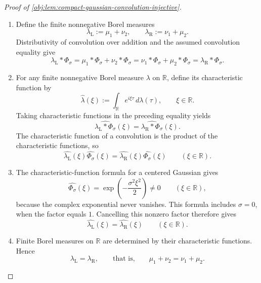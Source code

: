\begin{proof}[Proof of \cref{obj:lem:compact-gaussian-convolution-injective}]
\begin{enumerate}
\item Define the finite nonnegative Borel measures
\[
\lambda_{\mathrm L}:=\mu_1+\nu_2,
\qquad
\lambda_{\mathrm R}:=\nu_1+\mu_2.
\]
Distributivity of convolution over addition and the assumed convolution equality give
\[
\lambda_{\mathrm L}*\Phi_\sigma
=\mu_1*\Phi_\sigma+\nu_2*\Phi_\sigma
=\nu_1*\Phi_\sigma+\mu_2*\Phi_\sigma
=\lambda_{\mathrm R}*\Phi_\sigma.
\]

\item For any finite nonnegative Borel measure \(\lambda\) on \(\mathbb R\), define its characteristic function by
\[
\widehat{\lambda}(\xi)
:=\int_{\mathbb R}e^{i\xi\tau}\,d\lambda(\tau),
\qquad \xi\in\mathbb R.
\]
Taking characteristic functions in the preceding equality yields
\[
\widehat{\lambda_{\mathrm L}*\Phi_\sigma}(\xi)
=
\widehat{\lambda_{\mathrm R}*\Phi_\sigma}(\xi).
\]
The characteristic function of a convolution is the product of the characteristic functions, so
\[
\widehat{\lambda_{\mathrm L}}(\xi)\widehat{\Phi_\sigma}(\xi)
=
\widehat{\lambda_{\mathrm R}}(\xi)\widehat{\Phi_\sigma}(\xi)
\qquad(\xi\in\mathbb R).
\]

\item The characteristic-function formula for a centered Gaussian gives
\[
\widehat{\Phi_\sigma}(\xi)
=\exp\!\left(-\frac{\sigma^2\xi^2}{2}\right)\ne0
\qquad(\xi\in\mathbb R),
\]
because the complex exponential never vanishes. This formula includes \(\sigma=0\), when the factor equals \(1\). Cancelling this nonzero factor therefore gives
\[
\widehat{\lambda_{\mathrm L}}(\xi)
=
\widehat{\lambda_{\mathrm R}}(\xi)
\qquad(\xi\in\mathbb R).
\]

\item Finite Borel measures on \(\mathbb R\) are determined by their characteristic functions. Hence
\[
\lambda_{\mathrm L}=\lambda_{\mathrm R},
\qquad\text{that is,}\qquad
\mu_1+\nu_2=\nu_1+\mu_2.
\]
\end{enumerate}
\end{proof}
